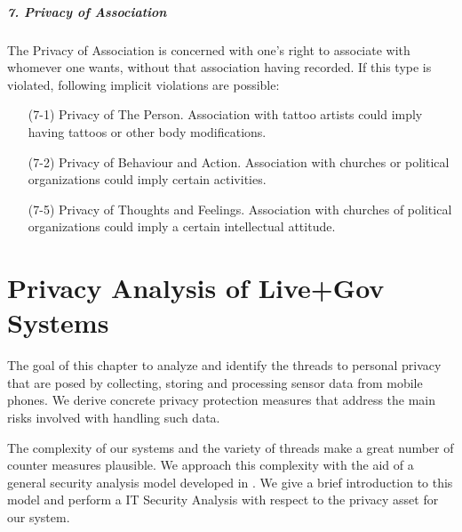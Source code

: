 \paragraph*{7. Privacy of Association}

The Privacy of Association is concerned with one's right to associate with whomever one wants, without that association having recorded.
If this type is violated, following implicit violations are possible:

\begin{itemize}

\item [(7-1)] Privacy of The Person.
  Association with tattoo artists could imply having tattoos or other body modifications.
\item [(7-2)] Privacy of Behaviour and Action.
  Association with churches or political organizations could imply certain activities.
\item [(7-5)] Privacy of Thoughts and Feelings.
  Association with churches of political organizations could imply a certain intellectual attitude.
\end{itemize}





\pagebreak

\chapter{Privacy Analysis of Live+Gov Systems}

The goal of this chapter to analyze and identify the threads to personal privacy that are posed by collecting, storing and processing sensor data from mobile phones.
We derive concrete privacy protection measures that address the main risks involved with handling such data.

The complexity of our systems and the variety of threads make a great number of counter measures plausible.
We approach this complexity with the aid of a general security analysis model developed in \cite{Grimm}.
We give a brief introduction to this model and perform a IT Security Analysis with respect to the privacy asset for our system.

